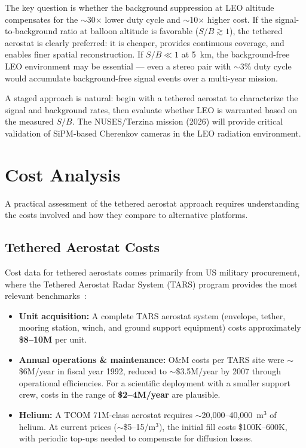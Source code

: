 \documentclass[11pt]{article}
\begin{document}
The key question is whether the background suppression at LEO
altitude compensates for the $\sim$30$\times$ lower duty cycle and
$\sim$10$\times$ higher cost.  If the signal-to-background ratio at
balloon altitude is favorable ($S/B \gtrsim 1$), the tethered aerostat
is clearly preferred: it is cheaper, provides continuous coverage,
and enables finer spatial reconstruction.  If $S/B \ll 1$ at 5~km,
the background-free LEO environment may be essential --- even a
stereo pair with $\sim$3\% duty cycle would accumulate
background-free signal events over a multi-year mission.

A staged approach is natural: begin with a tethered aerostat to
characterize the signal and background rates, then evaluate whether
LEO is warranted based on the measured $S/B$.  The NUSES/Terzina
mission (2026) will provide critical validation of SiPM-based
Cherenkov cameras in the LEO radiation environment.


\section{Cost Analysis}
\label{sec:cost}

A practical assessment of the tethered aerostat approach requires
understanding the costs involved and how they compare to alternative
platforms.

\subsection{Tethered Aerostat Costs}

Cost data for tethered aerostats comes primarily from US military
procurement, where the Tethered Aerostat Radar System (TARS) program
provides the most relevant benchmarks~\cite{TARS-wiki}:

\begin{itemize}[nosep]
  \item \textbf{Unit acquisition:} A complete TARS aerostat system
        (envelope, tether, mooring station, winch, and ground support
        equipment) costs approximately \textbf{\$8--10M} per unit.
  \item \textbf{Annual operations \& maintenance:}  O\&M costs per
        TARS site were $\sim$\$6M/year in fiscal year 1992, reduced to
        $\sim$\$3.5M/year by 2007 through operational efficiencies.
        For a scientific deployment with a smaller support crew, costs
        in the range of \textbf{\$2--4M/year} are plausible.
  \item \textbf{Helium:}  A TCOM 71M-class aerostat requires
        $\sim$20{,}000--40{,}000~m$^3$ of helium.  At current prices
        ($\sim$\$5--15/m$^3$), the initial fill costs
        \$100K--600K, with periodic top-ups needed to compensate for
        diffusion losses.
\end{itemize}
\end{document}
